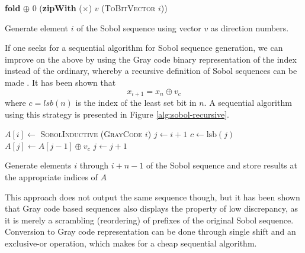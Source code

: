 \begin{algorithm}
  \begin{algorithmic}
    \State \Return \textbf{fold} $\oplus$ 0 (\textbf{zipWith} ($\times$) $v$ (\textsc{ToBitVector} $i$))
    \EndFunction
  \end{algorithmic}
  \caption{Generate element $i$ of the Sobol sequence using vector
    $v$ as direction numbers.}
  \label{alg:sobol-inductive}
\end{algorithm}


If one seeks for a sequential algorithm for Sobol sequence generation,
we can improve on the above by using the Gray code binary
representation of the index instead of the ordinary, whereby a
recursive definition of Sobol sequences can be made
\cite{bratley1988algorithm}. It has been shown that
$$x_{i+1} = x_n \oplus v_c$$
where $c = \mathit{lsb}(n)$ is the index of the least set bit in
$n$. A sequential algorithm using this strategy is presented in Figure
\ref{alg:sobol-recursive}.

\begin{algorithm}
  \begin{algorithmic}
    \State $A[i] \gets$ \textsc{SobolInductive} (\textsc{GrayCode} $i$)
    \State $j \gets i + 1$
    \State $c \gets \mathrm{lsb}(j)$
    \State $A[j] \gets A[j-1] \oplus v_c$
    \State $j \gets j + 1$
    \EndWhile
    \EndFunction
  \end{algorithmic}
  \caption{Generate elements $i$ through $i+n-1$ of the Sobol
    sequence and store results at the appropriate indices of $A$}
  \label{alg:sobol-recursive}
\end{algorithm}

This approach does not output the same sequence though, but it has
been shown \cite{bratley1988algorithm} that Gray code based sequences
also displays the property of low discrepancy, as it is merely a
scrambling (reordering) of prefixes of the original Sobol
sequence. Conversion to Gray code representation can be done through
single shift and an exclusive-or operation, which makes for a cheap
sequential algorithm.

